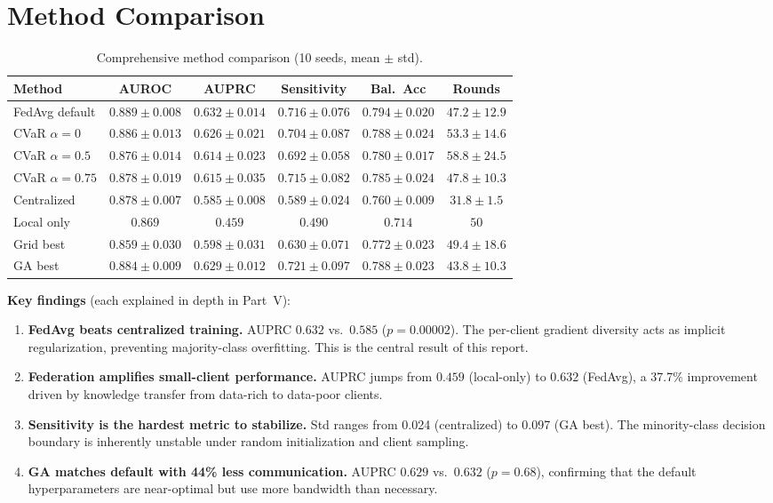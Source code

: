 \documentclass[11pt,a4paper]{report}
\begin{document}
\section{Method Comparison}

\begin{table}[H]
\centering
\caption{Comprehensive method comparison (10 seeds, mean $\pm$ std).}
\label{tab:methods}
\begin{tabular}{lccccc}
\toprule
\textbf{Method} & \textbf{AUROC} & \textbf{AUPRC} & \textbf{Sensitivity} & \textbf{Bal.\ Acc} & \textbf{Rounds} \\
\midrule
FedAvg default & $0.889 \pm 0.008$ & $0.632 \pm 0.014$ & $0.716 \pm 0.076$ & $0.794 \pm 0.020$ & $47.2 \pm 12.9$ \\
CVaR $\alpha=0$ & $0.886 \pm 0.013$ & $0.626 \pm 0.021$ & $0.704 \pm 0.087$ & $0.788 \pm 0.024$ & $53.3 \pm 14.6$ \\
CVaR $\alpha=0.5$ & $0.876 \pm 0.014$ & $0.614 \pm 0.023$ & $0.692 \pm 0.058$ & $0.780 \pm 0.017$ & $58.8 \pm 24.5$ \\
CVaR $\alpha=0.75$ & $0.878 \pm 0.019$ & $0.615 \pm 0.035$ & $0.715 \pm 0.082$ & $0.785 \pm 0.024$ & $47.8 \pm 10.3$ \\
Centralized & $0.878 \pm 0.007$ & $0.585 \pm 0.008$ & $0.589 \pm 0.024$ & $0.760 \pm 0.009$ & $31.8 \pm 1.5$ \\
Local only & $0.869$ & $0.459$ & $0.490$ & $0.714$ & $50$ \\
Grid best & $0.859 \pm 0.030$ & $0.598 \pm 0.031$ & $0.630 \pm 0.071$ & $0.772 \pm 0.023$ & $49.4 \pm 18.6$ \\
GA best & $0.884 \pm 0.009$ & $0.629 \pm 0.012$ & $0.721 \pm 0.097$ & $0.788 \pm 0.023$ & $43.8 \pm 10.3$ \\
\bottomrule
\end{tabular}
\end{table}

\textbf{Key findings} (each explained in depth in Part~V):
\begin{enumerate}[leftmargin=2em]
\item \textbf{FedAvg beats centralized training.} AUPRC $0.632$ vs.\ $0.585$ ($p = 0.00002$). The per-client gradient diversity acts as implicit regularization, preventing majority-class overfitting. This is the central result of this report.
\item \textbf{Federation amplifies small-client performance.} AUPRC jumps from $0.459$ (local-only) to $0.632$ (FedAvg), a 37.7\% improvement driven by knowledge transfer from data-rich to data-poor clients.
\item \textbf{Sensitivity is the hardest metric to stabilize.} Std ranges from 0.024 (centralized) to 0.097 (GA best). The minority-class decision boundary is inherently unstable under random initialization and client sampling.
\item \textbf{GA matches default with 44\% less communication.} AUPRC $0.629$ vs.\ $0.632$ ($p = 0.68$), confirming that the default hyperparameters are near-optimal but use more bandwidth than necessary.
\end{enumerate}
\end{document}
